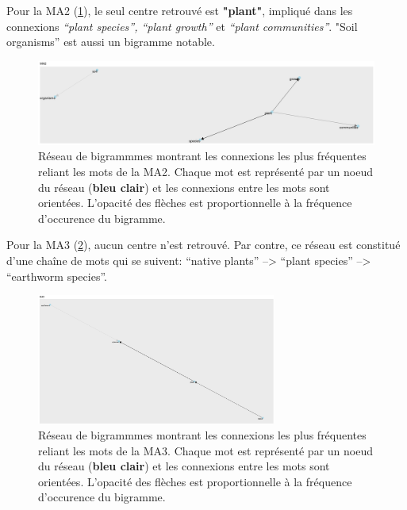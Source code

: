 \documentclass{book}
\begin{document}
Pour la MA2 (\cref{network2}), le seul centre retrouvé est \textbf{"plant"}, impliqué dans les connexions \textit{“plant species”, “plant growth”} et \textit{ “plant communities”}. "Soil organisms” est aussi un bigramme notable.

\begin{figure}[htb] %
    \begin{center} %
        \includegraphics[width=1\textwidth]{network2.png}
        \caption{Réseau de bigrammmes montrant les connexions les plus fréquentes reliant les mots de la MA2. Chaque mot est représenté par un noeud du réseau (\textbf{bleu clair}) et les connexions entre les mots sont orientées. L’opacité des flèches est proportionnelle à la fréquence d’occurence du bigramme.\label{network2}}
    \end{center}  
\end{figure}

\newpage
Pour la MA3 (\cref{network3}), aucun centre n'est retrouvé. Par contre, ce réseau est constitué d'une chaîne de mots qui se suivent: “native plants” –> “plant species” –> “earthworm species”.

\begin{figure}[htb] %
    \begin{center} %
        \includegraphics[width=0.7\textwidth]{network3.png}
        \caption{Réseau de bigrammmes montrant les connexions les plus fréquentes reliant les mots de la MA3. Chaque mot est représenté par un noeud du réseau (\textbf{bleu clair}) et les connexions entre les mots sont orientées. L’opacité des flèches est proportionnelle à la fréquence d’occurence du bigramme.\label{network3}}
    \end{center}  
\end{figure}
\end{document}
